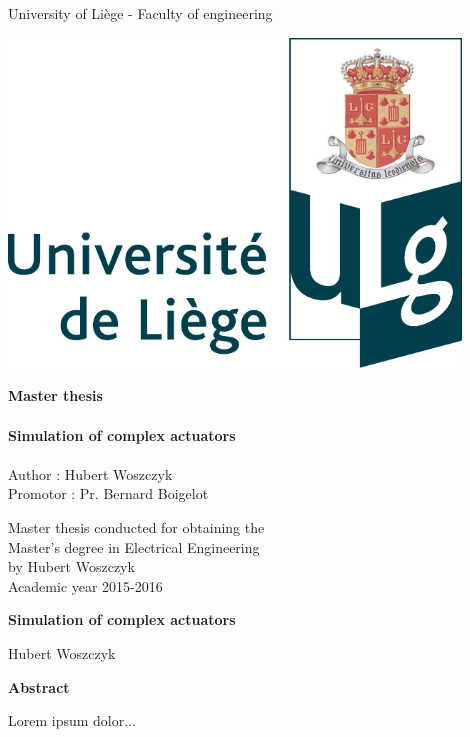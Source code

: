 \begin{titlepage}


\begin{center}
\large
University of Liège - Faculty of engineering
\end{center}

\vfill

\begin{minipage}{0.5\textwidth}
\includegraphics[width=0.9\textwidth]{figures/ULg_logo_couleur.pdf}
\end{minipage}
\begin{minipage}{0.5\textwidth}
\huge
\textbf{Master thesis}\\\\
\normalsize
\textbf{Simulation of complex actuators}\\\\
Author : Hubert Woszczyk\\
Promotor : Pr. Bernard Boigelot\\
\end{minipage}

\vfill
\begin{center}
\large
Master thesis conducted for obtaining the\\ Master's degree in Electrical Engineering\\ by Hubert Woszczyk\\
\vspace*{8cm}
\normalsize
Academic year 2015-2016
\end{center}

\end{titlepage}

\newpage\null\thispagestyle{empty}\newpage

\thispagestyle{empty}
\begin{center}
    \Large
    \textbf{Simulation of complex actuators}
        
    \vspace{0.4cm}
    \large
    Hubert Woszczyk
    \normalsize
    
    \vspace{0.9cm}
    \textbf{Abstract}
\end{center}
Lorem ipsum dolor...

